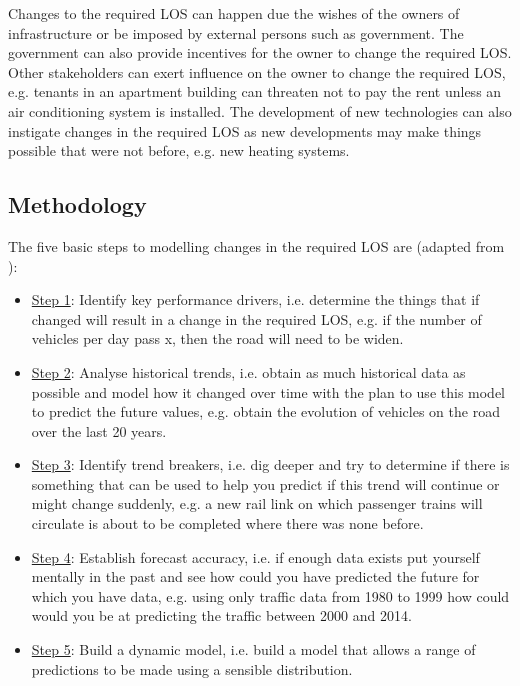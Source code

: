 Changes to the required LOS can happen due the wishes of the owners of infrastructure or be imposed by external persons such as government. The government can also provide incentives for the owner to change the required LOS. Other stakeholders can exert influence on the owner to change the required LOS, e.g. tenants in an apartment building can threaten not to pay the rent unless an air conditioning system is installed. The development of new technologies can also instigate changes in the required LOS as new developments may make things possible that were not before, e.g. new heating systems.

\subsection{Methodology}

The five basic steps to modelling changes in the required LOS are (adapted from \cite{Neufville2011}):

\begin{itemize}
	\item \underline{Step 1}:  Identify key performance drivers, i.e. determine the things that if changed will result in a change in the required LOS, e.g. if the number of vehicles per day pass x, then the road will need to be widen.
	\item \underline{Step 2}: Analyse historical trends, i.e. obtain as much historical data as possible and model how it changed over time with the plan to use this model to predict the future values, e.g. obtain the evolution of vehicles on the road over the last 20 years.
	\item \underline{Step 3}: Identify trend breakers, i.e. dig deeper and try to determine if there is something that can be used to help you predict if this trend will continue or might change suddenly, e.g. a new rail link on which passenger trains will circulate is about to be completed where there was none before.
	\item \underline{Step 4}: Establish forecast accuracy, i.e. if enough data exists put yourself mentally in the past and see how could you have predicted the future for which you have data, e.g. using only traffic data from 1980 to 1999 how could would you be at predicting the traffic between 2000 and 2014. 
	\item \underline{Step 5}: Build a dynamic model, i.e. build a model that allows a range of predictions to be made using a sensible distribution. 
\end{itemize}

